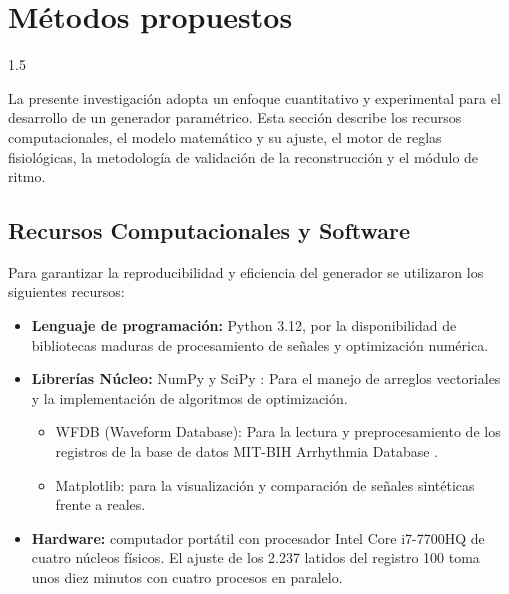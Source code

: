 
\section{Métodos propuestos}\label{sec:mp}
\begin{spacing}{1.5}

La presente investigación adopta un enfoque cuantitativo y experimental para el desarrollo de un generador paramétrico. Esta sección describe los recursos computacionales, el modelo matemático y su ajuste, el motor de reglas fisiológicas, la metodología de validación de la reconstrucción y el módulo de ritmo.

\subsection{Recursos Computacionales y Software}

Para garantizar la reproducibilidad y eficiencia del generador se utilizaron los siguientes recursos:

\begin{itemize}
    \item \textbf{Lenguaje de programación:} Python 3.12, por la disponibilidad de bibliotecas maduras de procesamiento de señales y optimización numérica.

    \item \textbf{Librerías Núcleo:} NumPy y SciPy \cite{virtanen2020scipy}: Para el manejo de arreglos vectoriales y la implementación de algoritmos de optimización.

    \begin{itemize}
        \item WFDB (Waveform Database): Para la lectura y preprocesamiento de los registros de la base de datos MIT-BIH Arrhythmia Database \cite{moody2001impact}.
        \item Matplotlib: para la visualización y comparación de señales sintéticas frente a reales.
    \end{itemize}

    \item \textbf{Hardware:} computador portátil con procesador Intel Core i7-7700HQ de cuatro núcleos físicos. El ajuste de los 2.237 latidos del registro 100 toma unos diez minutos con cuatro procesos en paralelo.
\end{itemize}


\end{spacing}
